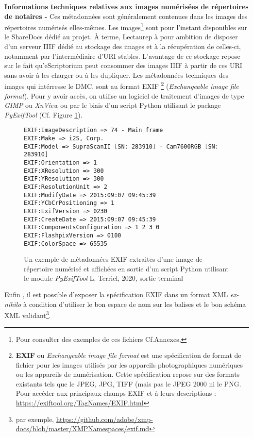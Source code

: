 \textbf{Informations techniques relatives aux images numérisées de répertoires de notaires -} Ces métadonnées sont généralement contenues dans les images des répertoires numérisés elles-mêmes. Les images\footnote{Pour consulter des exemples de ces fichiers Cf.Annexes, } sont pour l'instant disponibles sur le ShareDocs dédié au projet. À terme, Lectaurep à pour ambition de disposer d'un serveur IIIF dédié au stockage des images et à la récupération de celles-ci, notamment par l'intermédiaire d'URI stables. L'avantage de ce stockage repose sur le fait qu'eScriptorium peut consommer des images IIIF à partir de ces URI sans avoir à les charger ou à les dupliquer. 
Les métadonnées techniques des images qui intérresse le DMC, sont au format EXIF \footnote{\textbf{EXIF} ou \textit{Exchangeable image file format} est une spécification de format de fichier pour les images utilisés par les appareils photographiques numériques ou les appareils de numérisation. Cette spécification repose sur des formats existants tels que le JPEG, JPG, TIFF (mais pas le JPEG 2000 ni le PNG. Pour accéder aux principaux champs EXIF et à leurs descriptions : \url{https://exiftool.org/TagNames/EXIF.html}} (\textit{Exchangeable image file format}). Pour y avoir accès, on utilise un logiciel de traitement d'images de type \textit{GIMP} ou \textit{XnView} ou par le biais d'un script Python utilisant le package \textit{PyExifTool} (Cf. Figure \ref{fig:sortie_exif_metadata}). 

\begin{figure}[h]
\lstset{language=Python}
\begin{lstlisting}
EXIF:ImageDescription => 74 - Main frame
EXIF:Make => i2S, Corp.
EXIF:Model => SupraScanII [SN: 283910] - Cam7600RGB [SN: 283910]
EXIF:Orientation => 1
EXIF:XResolution => 300
EXIF:YResolution => 300
EXIF:ResolutionUnit => 2
EXIF:ModifyDate => 2015:09:07 09:45:39
EXIF:YCbCrPositioning => 1
EXIF:ExifVersion => 0230
EXIF:CreateDate => 2015:09:07 09:45:39
EXIF:ComponentsConfiguration => 1 2 3 0
EXIF:FlashpixVersion => 0100
EXIF:ColorSpace => 65535
\end{lstlisting}
\caption{Un exemple de métadonnées EXIF extraites d'une image de répertoire numérisé et affichées en sortie d'un script Python utilisant le module \textit{PyExifTool}  \textcopyright L. Terriel, 2020, sortie terminal}
\label{fig:sortie_exif_metadata}
\end{figure}
\newpage
Enfin , il est possible d'exposer la spécification EXIF dans un format XML \textit{ex-nihilo} à condition d'utiliser le bon espace de nom sur les balises et le bon schéma XML validant\footnote{par exemple, \url{https://github.com/adobe/xmp-docs/blob/master/XMPNamespaces/exif.md}}.\\

